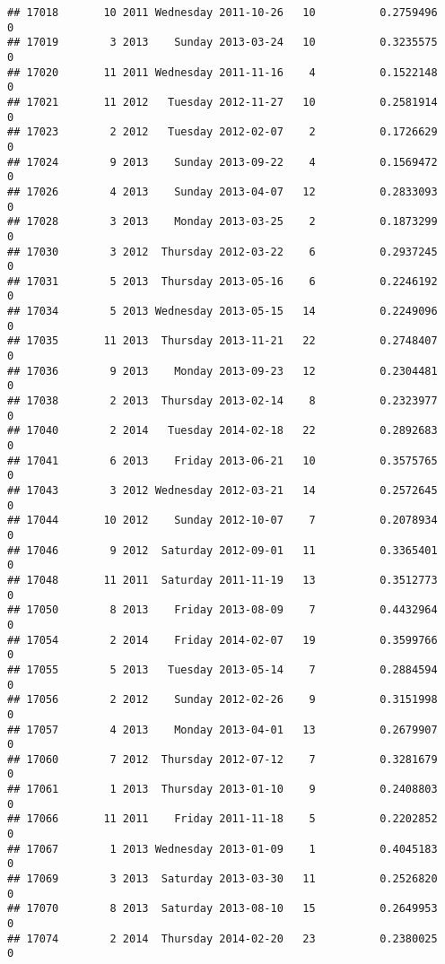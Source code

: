 \documentclass[
]{article}
\begin{document}
\begin{verbatim}
## 17018       10 2011 Wednesday 2011-10-26   10          0.2759496             0
## 17019        3 2013    Sunday 2013-03-24   10          0.3235575             0
## 17020       11 2011 Wednesday 2011-11-16    4          0.1522148             0
## 17021       11 2012   Tuesday 2012-11-27   10          0.2581914             0
## 17023        2 2012   Tuesday 2012-02-07    2          0.1726629             0
## 17024        9 2013    Sunday 2013-09-22    4          0.1569472             0
## 17026        4 2013    Sunday 2013-04-07   12          0.2833093             0
## 17028        3 2013    Monday 2013-03-25    2          0.1873299             0
## 17030        3 2012  Thursday 2012-03-22    6          0.2937245             0
## 17031        5 2013  Thursday 2013-05-16    6          0.2246192             0
## 17034        5 2013 Wednesday 2013-05-15   14          0.2249096             0
## 17035       11 2013  Thursday 2013-11-21   22          0.2748407             0
## 17036        9 2013    Monday 2013-09-23   12          0.2304481             0
## 17038        2 2013  Thursday 2013-02-14    8          0.2323977             0
## 17040        2 2014   Tuesday 2014-02-18   22          0.2892683             0
## 17041        6 2013    Friday 2013-06-21   10          0.3575765             0
## 17043        3 2012 Wednesday 2012-03-21   14          0.2572645             0
## 17044       10 2012    Sunday 2012-10-07    7          0.2078934             0
## 17046        9 2012  Saturday 2012-09-01   11          0.3365401             0
## 17048       11 2011  Saturday 2011-11-19   13          0.3512773             0
## 17050        8 2013    Friday 2013-08-09    7          0.4432964             0
## 17054        2 2014    Friday 2014-02-07   19          0.3599766             0
## 17055        5 2013   Tuesday 2013-05-14    7          0.2884594             0
## 17056        2 2012    Sunday 2012-02-26    9          0.3151998             0
## 17057        4 2013    Monday 2013-04-01   13          0.2679907             0
## 17060        7 2012  Thursday 2012-07-12    7          0.3281679             0
## 17061        1 2013  Thursday 2013-01-10    9          0.2408803             0
## 17066       11 2011    Friday 2011-11-18    5          0.2202852             0
## 17067        1 2013 Wednesday 2013-01-09    1          0.4045183             0
## 17069        3 2013  Saturday 2013-03-30   11          0.2526820             0
## 17070        8 2013  Saturday 2013-08-10   15          0.2649953             0
## 17074        2 2014  Thursday 2014-02-20   23          0.2380025             0

\end{verbatim}
\end{document}
